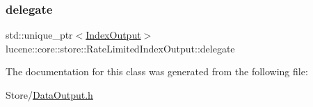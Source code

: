 \subsubsection{\texorpdfstring{delegate}{delegate}}
{\footnotesize\ttfamily std\+::unique\+\_\+ptr$<$\mbox{\hyperlink{classlucene_1_1core_1_1store_1_1IndexOutput}{Index\+Output}}$>$ lucene\+::core\+::store\+::\+Rate\+Limited\+Index\+Output\+::delegate\hspace{0.3cm}{\ttfamily [private]}}



The documentation for this class was generated from the following file\+:\begin{DoxyCompactItemize}
\item 
Store/\mbox{\hyperlink{DataOutput_8h}{Data\+Output.\+h}}\end{DoxyCompactItemize}
